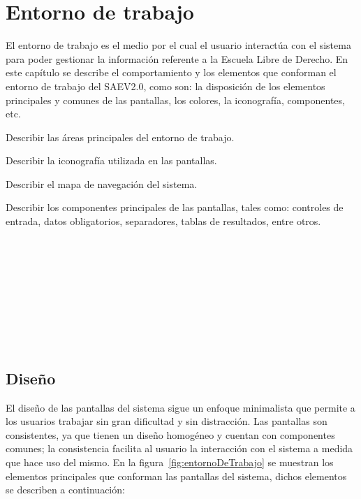 
\section{Entorno de trabajo}

    El entorno de trabajo es el medio por el cual el usuario interactúa con el sistema para poder gestionar la información referente a la Escuela Libre de Derecho. En este capítulo se describe el comportamiento y los elementos que conforman el entorno de 
    trabajo del SAEV2.0, como son: la disposición de los elementos principales y comunes de las pantallas, los colores, la iconografía, componentes, etc. \bigskip

    \begin{objetivos}
      \item Describir las áreas principales del entorno de trabajo.
      \item Describir la iconografía utilizada en las pantallas.
      \item Describir el mapa de navegación del sistema.
      \item Describir los componentes principales de las pantallas, tales como: controles de entrada, datos obligatorios, separadores, tablas de resultados, entre otros.
    \end{objetivos}
\\\\\\\\\\\\\\\\

\subsection{Diseño}

  El diseño de las pantallas del sistema sigue un enfoque minimalista que permite a los usuarios trabajar sin gran dificultad y sin distracción. 
  Las pantallas son consistentes, ya que tienen un diseño homogéneo y cuentan con componentes comunes; la consistencia facilita al usuario la interacción
  con el sistema a medida que hace uso del mismo. En la figura~\ref{fig:entornoDeTrabajo} se muestran los elementos principales que conforman las pantallas del sistema, 
  dichos elementos se describen a continuación:

